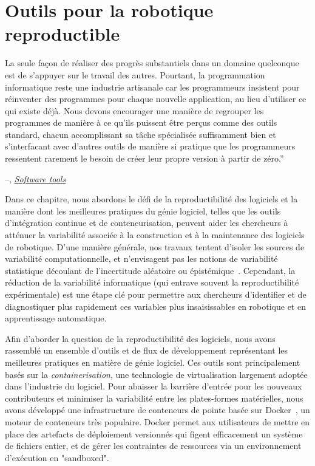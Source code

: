 \chapter{Outils pour la robotique reproductible}\label{ch:ducker}

\setlength{\epigraphwidth}{0.93\textwidth}
\epigraph{La seule façon de réaliser des progrès substantiels dans un domaine quelconque est de s'appuyer sur le travail des autres. Pourtant, la programmation informatique reste une industrie artisanale car les programmeurs insistent pour réinventer des programmes pour chaque nouvelle application, au lieu d'utiliser ce qui existe déjà. Nous devons encourager une manière de regrouper les programmes de manière à ce qu'ils puissent être perçus comme des outils standard, chacun accomplissant sa tâche spécialisée suffisamment bien et s'interfacant avec d'autres outils de manière si pratique que les programmeurs ressentent rarement le besoin de créer leur propre version à partir de zéro.''}{\begin{flushright}--\citet{kernighan1976software}, \href{https://dl.acm.org/doi/10.1145/1010726.1010728}{\textit{Software tools}}\end{flushright}}

Dans ce chapitre, nous abordons le défi de la reproductibilité des logiciels et la manière dont les meilleures pratiques du génie logiciel, telles que les outils d'intégration continue et de conteneurisation, peuvent aider les chercheurs à atténuer la variabilité associée à la construction et à la maintenance des logiciels de robotique. D'une manière générale, nos travaux tentent d'isoler les sources de variabilité computationnelle, et n'envisagent pas les notions de variabilité statistique découlant de l'incertitude aléatoire ou épistémique~\citep{diaz2018interactive}. Cependant, la réduction de la variabilité informatique (qui entrave souvent la reproductibilité expérimentale) est une étape clé pour permettre aux chercheurs d'identifier et de diagnostiquer plus rapidement ces variables plus insaisissables en robotique et en apprentissage automatique.

Afin d'aborder la question de la reproductibilité des logiciels, nous avons rassemblé un ensemble d'outils et de flux de développement représentant les meilleures pratiques en matière de génie logiciel. Ces outils sont principalement basés sur la \textit{containerisation}, une technologie de virtualisation largement adoptée dans l'industrie du logiciel. Pour abaisser la barrière d'entrée pour les nouveaux contributeurs et minimiser la variabilité entre les plates-formes matérielles, nous avons développé une infrastructure de conteneurs de pointe basée sur Docker~\citep{merkel2014docker}, un moteur de conteneurs très populaire. Docker permet aux utilisateurs de mettre en place des artefacts de déploiement versionnés qui figent efficacement un système de fichiers entier, et de gérer les contraintes de ressources via un environnement d'exécution en "sandboxed".

